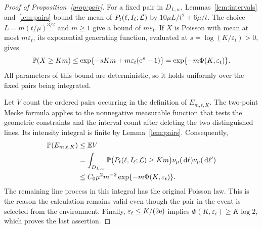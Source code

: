 \documentclass[11pt,letterpaper]{article}
\begin{document}
\begin{proof}[Proof of Proposition~\ref{prop:pair}]
For a fixed pair in $D_{L,w}$, Lemmas~\ref{lem:intervals} and~\ref{lem:pairs} bound the mean of $P_t(\ell,I_\ell;\mathcal L)$ by $10\mu L/t^2+6\mu/t$. The choice $L=m(t/\mu)^{3/2}$ and $m\ge1$ give a bound of $m\varepsilon_t$. If $X$ is Poisson with mean at most $m\varepsilon_t$, its exponential generating function, evaluated at $s=\log(K/\varepsilon_t)>0$, gives
\[
 \mathbb P(X\ge Km)\le
 \exp\{-sKm+m\varepsilon_t(\mathrm{e}^s-1)\}
 =\exp\{-m\Phi(K,\varepsilon_t)\}.
\]
All parameters of this bound are deterministic, so it holds uniformly over the fixed pairs being integrated.

Let $V$ count the ordered pairs occurring in the definition of $E_{m,t,K}$. The two-point Mecke formula \cite[Theorem~4.4]{LP17} applies to the nonnegative measurable function that tests the geometric constraints and the interval count after deleting the two distinguished lines. Its intensity integral is finite by Lemma~\ref{lem:pairs}. Consequently,
\[
\begin{aligned}
 \mathbb P(E_{m,t,K})&\le\mathbb E V\\
 &=\int_{D_{L,w}}
    \mathbb P\big(P_t(\ell,I_\ell;\mathcal L)\ge Km\big)
          \nu_\mu(\,\mathrm{d}\ell)\nu_\mu(\,\mathrm{d}\ell')\\
 &\le C_0\mu^2m^{-2}\exp\{-m\Phi(K,\varepsilon_t)\}.
\end{aligned}
\]
The remaining line process in this integral has the original Poisson law. This is the reason the calculation remains valid even though the pair in the event is selected from the environment. Finally, $\varepsilon_t\le K/(2\mathrm{e})$ implies $\Phi(K,\varepsilon_t)\ge K\log2$, which proves the last assertion.
\end{proof}
\end{document}
